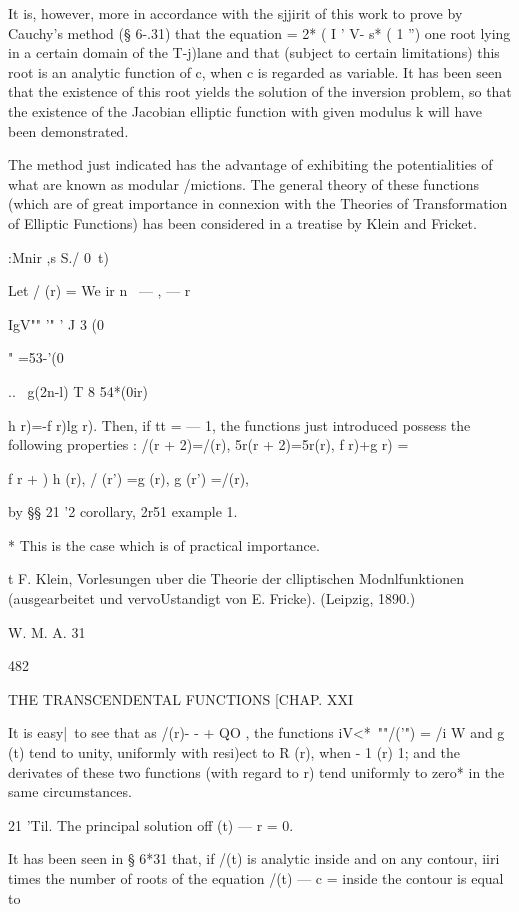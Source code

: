 It is, however, more in accordance with the sjjirit of this work to
prove by Cauchy's method (§ 6-.31) that the equation = 2* ( I ' V- s*
( 1 '') one root lying in a certain domain of the T-j)lane and that
(subject to certain limitations) this root is an analytic function of
c, when c is regarded as variable. It has been seen that the existence
of this root yields the solution of the inversion problem, so that the
existence of the Jacobian elliptic function with given modulus k will
have been demonstrated.

The method just indicated has the advantage of exhibiting the
potentialities of what are known as modular /mictions. The general
theory of these functions (which are of great importance in connexion
with the Theories of Transformation of Elliptic Functions) has been
considered in a treatise by Klein and Fricket.

:Mnir ,s S./ 0\ t)

Let / (r) = We ir n \ — , — r \

IgV"" '" ' J 3 (0

" =53-'(0

.. \ g(2n-l) T 8 54*(0ir)

h r)=-f r)lg r). Then, if tt = — 1, the functions just introduced
possess the following properties : /(r + 2)=/(r), 5r(r + 2)=5r(r), f
r)+g r) = \,

f r + ) h (r), / (r') =g (r), g (r') =/(r),

by §§ 21 '2 corollary, 2r51 example 1.

* This is the case which is of practical importance.

t F. Klein, Vorlesungen uber die Theorie der clliptischen
Modnlfunktionen (ausgearbeitet und vervoUstandigt von E. Fricke).
(Leipzig, 1890.)

W. M. A. 31

482

THE TRANSCENDENTAL FUNCTIONS [CHAP. XXI

It is easy|\ to see that as /(r)- - + QO , the functions iV<*~""/('")
= /i W and g (t) tend to unity, uniformly with resi)ect to R (r), when
- 1 (r) 1; and the derivates of these two functions (with regard to
r) tend uniformly to zero* in the same circumstances.

21 'Til. The principal solution off (t) — r = 0.

It has been seen in § 6*31 that, if /(t) is analytic inside and on any
contour, iiri times the number of roots of the equation /(t) — c =
inside the contour is equal to

